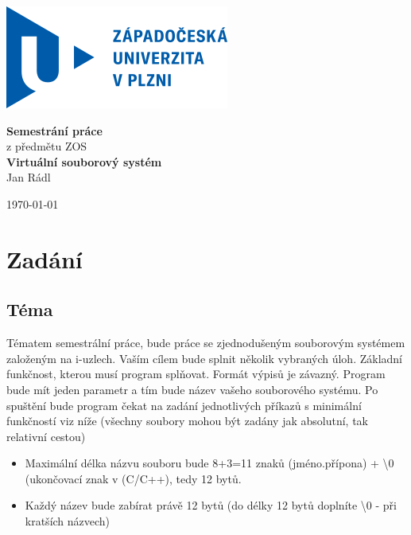 \documentclass[12pt, a4paper]{report}
\begin{document}
\begin{titlepage}
\includegraphics{logo}
\enlargethispage{25mm}
\addtolength{\topmargin}{-8mm}
\thispagestyle{empty}
\vspace*{\fill}
\begin{center}
      {\Huge \bf {Semestrání práce}}\\[0.2cm]
      { z předmětu ZOS}\\[0.1cm]
      {\large \bf Virtuální souborový systém}\\[0.5cm]
      
      {\Large Jan Rádl}\\[0.4cm]
\end{center}
\vspace*{\fill}
\begin{flushright}
\vfill
\today
\end{flushright}
\end{titlepage}

\tableofcontents




\chapter{Zadání}
\section{Téma}
Tématem semestrální práce, bude práce se zjednodušeným souborovým systémem založeným na
i-uzlech. Vaším cílem bude splnit několik vybraných úloh.
Základní funkčnost, kterou musí program splňovat. Formát výpisů je závazný.
Program bude mít jeden parametr a tím bude název vašeho souborového systému. Po spuštění bude
program čekat na zadání jednotlivých příkazů s minimální funkčností viz níže (všechny soubory
mohou být zadány jak absolutní, tak relativní cestou)
\begin{itemize}
\item Maximální délka názvu souboru bude 8+3=11 znaků (jméno.přípona) + {\textbackslash}0 (ukončovací znak v (C/C++), tedy 12 bytů.
 \item Každý název bude zabírat právě 12 bytů (do délky 12 bytů doplníte \textbackslash0 - při kratších názvech)
\end{itemize}
\end{document}
